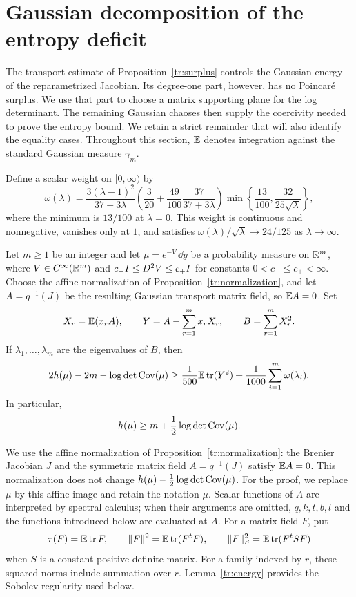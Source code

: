 \section{Gaussian decomposition of the entropy deficit}
\label{mat:section}

The transport estimate of Proposition~\ref{tr:surplus} controls the
Gaussian energy of the reparametrized Jacobian.  Its degree-one part,
however, has no Poincar\'e surplus.  We use that part to choose a matrix
supporting plane for the log determinant.  The remaining Gaussian
chaoses then supply the coercivity needed to prove the entropy bound.
We retain a strict remainder that will also identify the equality cases.
Throughout this section, $\mathbb E$ denotes integration against the standard
Gaussian measure $\gamma_m$.

Define a scalar weight on $[0,\infty)$ by
\begin{equation}\label{mat:rigidity-weight}
 \omega(\lambda)=
 \frac{3(\lambda-1)^2}{37+3\lambda}
 \left(\frac3{20}+\frac{49}{100}\frac{37}{37+3\lambda}\right)
 \min\left\{\frac{13}{100},\frac{32}{25\sqrt\lambda}\right\},
\end{equation}
where the minimum is $13/100$ at $\lambda=0$.
This weight is continuous and nonnegative, vanishes only at $1$, and
satisfies $\omega(\lambda)/\sqrt\lambda\to24/125$ as
$\lambda\to\infty$.

\begin{theorem}
\label{mat:entropy-smooth}\label{prop:slack}
Let $m\ge1$ be an integer and let $\mu=e^{-V}\,\dd y$ be a
probability measure on $\mathbb R^m$, where
$V\in C^\infty(\mathbb R^m)$ and
$c_-I\le D^2V\le c_+I$ for constants $0<c_-\le c_+<\infty$.
Choose the affine normalization of Proposition~\ref{tr:normalization},
and let $A=q^{-1}(J)$ be the resulting Gaussian transport matrix field,
so $\mathbb E A=0$.  Set
\[
 X_r=\mathbb E(x_rA),\qquad Y=A-\sum_{r=1}^m x_rX_r,\qquad
 B=\sum_{r=1}^mX_r^2.
\]
If $\lambda_1,\ldots,\lambda_m$ are the eigenvalues of $B$, then
\begin{equation}\label{mat:strict-remainder}
 2h(\mu)-2m-\log\det\operatorname{Cov}(\mu)
 \ge \frac1{500}\mathbb E\operatorname{tr}(Y^2)
       +\frac1{1000}\sum_{i=1}^m\omega(\lambda_i).
\end{equation}
In particular,
\[
 h(\mu)\ge m+\frac12\log\det\operatorname{Cov}(\mu).
\]
\end{theorem}

We use the affine normalization of
Proposition~\ref{tr:normalization}: the Brenier Jacobian $J$ and the
symmetric matrix field $A=q^{-1}(J)$ satisfy $\mathbb E A=0$.  This normalization
does not change $h(\mu)-\frac12\log\det\operatorname{Cov}(\mu)$.  For the proof,
we replace $\mu$ by this affine image and retain the notation $\mu$.
Scalar functions of $A$
are interpreted by spectral calculus; when their arguments are omitted,
$q,k,t,b,l$ and the functions introduced below are evaluated at $A$.  For a matrix field $F$, put
\[
 \tau(F)=\mathbb E\operatorname{tr} F,\qquad
 \|F\|^2=\mathbb E\operatorname{tr}(F^tF),\qquad
 \|F\|_S^2=\mathbb E\operatorname{tr}(F^tSF)
\]
when $S$ is a constant positive definite matrix.  For a family indexed
by $r$, these squared norms include summation over $r$.  Lemma~\ref{tr:energy}
provides the Sobolev regularity used below.

